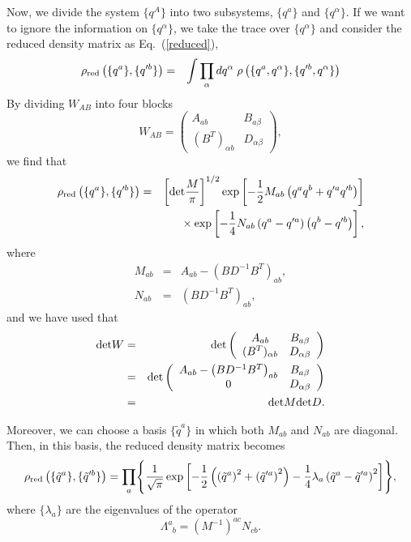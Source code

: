 \documentclass[12pt,epsf]{article}
\def\sp{\phantom{a}}
\begin{document}
Now, we divide the system $\{q^A\}$
into two subsystems, $\{q^a\}$ and $\{q^\alpha\}$.
If we want to ignore the information on $\{q^\alpha\}$,
we take the trace over $\{q^\alpha\}$ and consider
the reduced density matrix as Eq.~(\ref{reduced}),
\begin{eqnarray}
 \rho_{{\rm red}}\left(\{q^a\},\{q'^b\}\right)
  &=& \int \prod_\alpha dq^\alpha
        \;\rho\left(\{q^a,q^\alpha\},\{q'^b,q^\alpha\}\right)
\end{eqnarray}
By dividing $W_{AB}$ into four blocks
\begin{equation}
W_{AB}=\left(\begin{array}{cc}
 A_{ab} & B_{a\beta} \\
 (B^T)_{\alpha b} & D_{\alpha\beta}
\end{array}\right),
\end{equation}
we find that
\begin{eqnarray}
 \rho_{{\rm red}}\left(\{q^a\},\{q'^b\}\right)
  &=& \left[{\rm det}\frac{M}{\pi}\right]^{1/2}
        \exp\left[-\frac{1}{2}M_{ab}
       \left(q^aq^b+q'^aq'^b\right) \right] \nonumber \\
  & &  {}\times \exp\left[-\frac{1}{4}N_{ab}
        \left(q^a-q'^a\right)\left(q^b-q'^b\right)\right],
\end{eqnarray}
where
\begin{eqnarray}
  M_{ab} &=& A_{ab}-\left(BD^{-1}B^T\right)_{ab}, \\
  N_{ab} &=& \left(BD^{-1}B^T\right)_{ab},
\end{eqnarray}
and we have used that
\begin{eqnarray*}
 {\rm det}W &=& {\rm det}\left(\begin{array}{cc}
 A_{ab} & B_{a\beta} \\
 (B^T)_{\alpha b} & D_{\alpha\beta}
\end{array}\right)   \\
  &=& {\rm det}\left(\begin{array}{cc}
 A_{ab}-\left(BD^{-1}B^T\right)_{ab} & B_{a\beta} \\
 0 & D_{\alpha\beta}
\end{array}\right)  \\
 &=& {\rm det}M{\rm det}D.
\end{eqnarray*}

Moreover, we can choose a basis $\{\tilde{q}^a\}$
in which both $M_{ab}$ and $N_{ab}$ are diagonal.
Then, in this basis, the reduced density matrix
becomes
\begin{equation}
 \rho_{{\rm red}}\left(\{\tilde{q}^a\},\{\tilde{q}'^b\}\right)
  = \prod_a\Biggl\{ \frac{1}{\sqrt{\pi}}
        \exp\left[-\frac{1}{2}
       \left(\left(\tilde{q}^a\right)^2+\left(\tilde{q}'^a\right)^2
        \right)-\frac{1}{4}\lambda_a
        \left(\tilde{q}^a-\tilde{q}'^a\right)^2
        \right]\Biggr\},
\end{equation}
where $\{\lambda_a\}$ are the eigenvalues of the operator
\begin{equation}
  \Lambda^a_{\sp b}=(M^{-1})^{ac}N_{cb}.
\label{defL1}
\end{equation}
\end{document}
